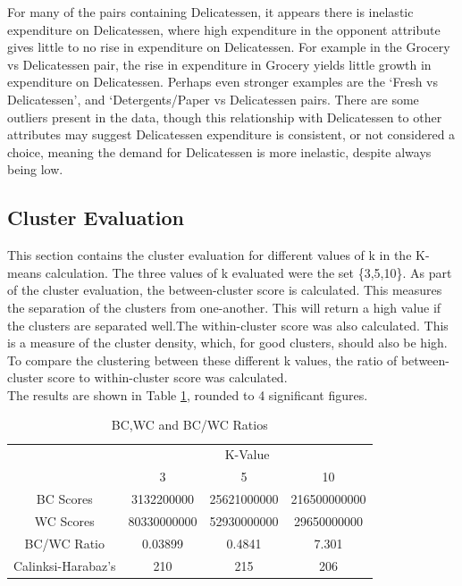\documentclass{article}
\begin{document}
For many of the pairs containing Delicatessen, it appears there is inelastic expenditure on Delicatessen, where high expenditure in the
opponent attribute gives little to no rise in expenditure on Delicatessen. For example in the Grocery vs Delicatessen pair, the rise in
expenditure in Grocery yields little growth in expenditure on Delicatessen. Perhaps even stronger examples are the `Fresh vs Delicatessen',
and `Detergents/Paper vs Delicatessen pairs. There are some outliers present in the data, though this relationship with Delicatessen to 
other attributes may suggest Delicatessen expenditure is consistent, or not considered a choice, meaning the demand for Delicatessen is 
more inelastic, despite always being low.\\


\subsection{Cluster Evaluation} 

\noindent This section contains the cluster evaluation for different values of k in the K-means calculation. The three values of k evaluated
were the set \{3,5,10\}. As part of the cluster evaluation, the between-cluster score is calculated. This measures the separation of the clusters from one-another.
This will return a high value if the clusters are separated well.The within-cluster score was also calculated. This is a measure of the cluster density, which, for good clusters, should also be high.\\
To compare the clustering between these different k values, the ratio of between-cluster score to within-cluster score was calculated.\\
The results are shown in Table \ref{table:kvals}, rounded to 4 significant figures.
\vspace{4mm}

{\begin{table}
        \centering
        
\begin{tabular}{ c|c|c|c|}
        \cline{2-4} & \multicolumn{3}{|c|}{K-Value}\\
        \cline{2-4} & 3 & 5 & 10\\
        \hline
        \multicolumn{1}{|c|}{BC Scores} & 3132200000 &  25621000000 & 216500000000 \\
        \multicolumn{1}{|c|}{WC Scores} & 80330000000 &  52930000000 &  29650000000\\
        \multicolumn{1}{|c|}{BC/WC Ratio} & 0.03899 & 0.4841 &  7.301\\
        \hline
        \multicolumn{1}{|c|}{Calinksi-Harabaz's} & 210 &  215 & 206\\

        \hline

       \end{tabular}

        \caption{BC,WC and BC/WC Ratios}
        \label{table:kvals}

\end{table}}
\end{document}
